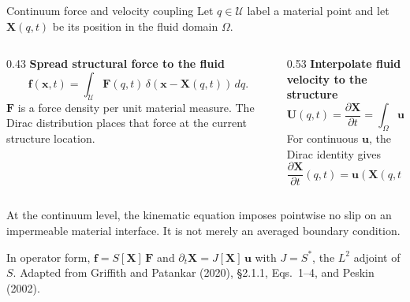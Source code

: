 \documentclass[aspectratio=169,11pt]{beamer}
\newcommand{\xvec}{\bm{x}}
\newcommand{\uvec}{\bm{u}}
\newcommand{\Xvec}{\bm{X}}
\newcommand{\Fvec}{\bm{F}}
\newcommand{\fvec}{\bm{f}}
\newcommand{\Uvec}{\bm{U}}
\begin{document}
\begin{frame}{Continuum force and velocity coupling}
Let $q\in\mathcal U$ label a material point and let $\Xvec(q,t)$ be its position in the fluid domain $\Omega$.
\begin{columns}[T,onlytextwidth]
\begin{column}{0.43\textwidth}
\textbf{Spread structural force to the fluid}
\[
  \fvec(\xvec,t)
  =\int_{\mathcal U}\Fvec(q,t)\,
  \delta\!\left(\xvec-\Xvec(q,t)\right)\,dq.
\]
$\Fvec$ is a force density per unit material measure. The Dirac distribution places that force at the current structure location.
\end{column}
\begin{column}{0.53\textwidth}
\textbf{Interpolate fluid velocity to the structure}
\[
  \Uvec(q,t)=\frac{\partial\Xvec}{\partial t}
  =\int_{\Omega}\uvec(\xvec,t)\,
  \delta\!\left(\xvec-\Xvec(q,t)\right)\,d\xvec.
\]
For continuous $\uvec$, the Dirac identity gives
\[
  \frac{\partial\Xvec}{\partial t}(q,t)
  =\uvec\!\left(\Xvec(q,t),t\right).
\]
\end{column}
\end{columns}
\smallskip
\begin{punchbox}
\small At the continuum level, the kinematic equation imposes pointwise no slip on an impermeable material interface. It is not merely an averaged boundary condition.
\end{punchbox}
{\scriptsize In operator form, $\fvec=S[\Xvec]\,\Fvec$ and $\partial_t\Xvec=J[\Xvec]\,\uvec$ with $J=S^{*}$, the $L^2$ adjoint of $S$. Adapted from Griffith and Patankar (2020), \S2.1.1, Eqs.~1--4, and Peskin (2002).\par}
\end{frame}
\end{document}
